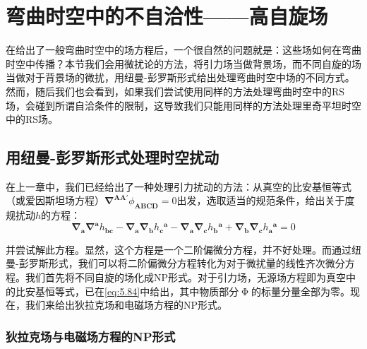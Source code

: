 \chapter{弯曲时空中的不自洽性——高自旋场}

在给出了一般弯曲时空中的场方程后，一个很自然的问题就是：这些场如何在弯曲时空中传播？本节我们会用微扰论的方法，将引力场当做背景场，而不同自旋的场当做对于背景场的微扰，用纽曼-彭罗斯形式给出处理弯曲时空中场的不同方式。然而，随后我们也会看到，如果我们尝试使用同样的方法处理弯曲时空中的RS场，会碰到所谓自洽条件的限制，这导致我们只能用同样的方法处理里奇平坦时空中的RS场。
\section{用纽曼-彭罗斯形式处理时空扰动}

在上一章中，我们已经给出了一种处理引力扰动的方法：从真空的比安基恒等式（或爱因斯坦场方程）$\mathbf{\nabla }^{\boldsymbol{AA} '} \phi _{\boldsymbol{ABCD}} =0$出发，选取适当的规范条件，给出关于度规扰动$h$的方程：\begin{equation}
	\mathbf{\nabla }_{\boldsymbol{a}}\mathbf{\nabla }^{\boldsymbol{a}} h_{\boldsymbol{bc}} -\mathbf{\nabla }_{\boldsymbol{a}}\mathbf{\nabla }_{\boldsymbol{b}} h{_{\boldsymbol{c}}}^{\boldsymbol{a}} -\mathbf{\nabla }_{\boldsymbol{a}}\mathbf{\nabla }_{\boldsymbol{c}} h{_{\boldsymbol{b}}}^{\boldsymbol{a}} +\mathbf{\nabla }_{\boldsymbol{b}}\mathbf{\nabla }_{\boldsymbol{c}} h{_{\boldsymbol{a}}}^{\boldsymbol{a}} =0
	\label{eq:7.1}
\end{equation}

并尝试解此方程。显然，这个方程是一个二阶偏微分方程，并不好处理。而通过纽曼-彭罗斯形式，我们可以将二阶偏微分方程转化为对于微扰量的线性齐次微分方程。我们首先将不同自旋的场化成NP形式。对于引力场，无源场方程即为真空中的比安基恒等式，已在\ref{eq:5.84}中给出，其中物质部分$\upPhi $的标量分量全部为零。现在，我们来给出狄拉克场和电磁场方程的NP形式。


\subsection{狄拉克场与电磁场方程的NP形式}

